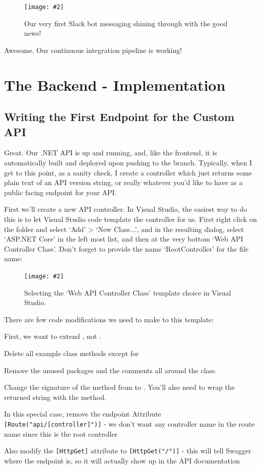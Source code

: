 \documentclass[a4paper,headinclude=on,footinclude=on,12pt,oneside]{scrbook}
\newcommand{\standardfigure}[3]{\begin{figure}[H]\begin{center}\texttt{[image: \#2]}\caption{#3}\label{fig:#2}\end{center}\end{figure}}
\begin{document}
\standardfigure{\textwidth}{backend/slack/deploy-bot-first-message}{Our very first Slack bot messaging shining through with the good news!}

Awesome. Our continuous integration pipeline is working!

\chapter{The Backend - Implementation}

\section{Writing the First Endpoint for the Custom API}

Great. Our .NET API is up and running, and, like the frontend, it is automatically built and deployed upon pushing to the  branch. Typically, when I get to this point, as a sanity check, I create a  controller which just returns some plain text of an API version string, or really whatever you'd like to have as a public facing endpoint for your API.


First we'll create a new API controller. In Visual Studio, the easiest way to do this is to let Visual Studio code template the controller for us. First right click on the  folder and select `Add' > `New Class...', and in the resulting dialog, select `ASP.NET Core' in the left most list, and then at the very bottom `Web API Controller Class'. Don't forget to provide the name `RootController' for the file name:

\standardfigure{\textwidth}{backend/web-api-controller}{Selecting the `Web API Controller Class' template choice in Visual Studio.}

There are few code modifications we need to make to this template: 

\begin{arrows}
\item First, we want to extend , not . 
\item Delete all example class methods except for 
\item Remove the unused packages and the comments all around the class.
\item Change the signature of the  method from  to . You'll also need to wrap the returned string with the  method.
\item In this special case, remove the endpoint Attribute \texttt{[Route("api/[controller]")]} - we don't want any controller name in the route name since this is the root controller
\item Also modify the \texttt{[HttpGet]} attribute to \texttt{[HttpGet("/")]} - this will tell Swagger where the endpoint is, so it will actually show up in the API documentation
\end{arrows}
\end{document}

